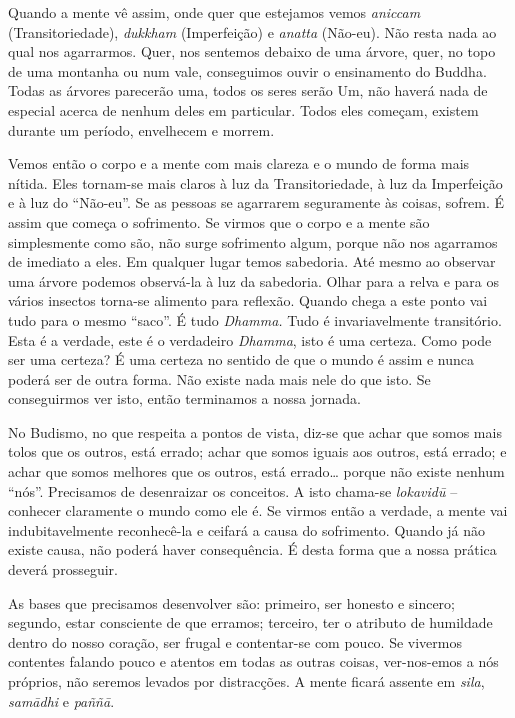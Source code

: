 Quando a mente vê assim, onde quer que estejamos vemos \emph{aniccam}
(Transitoriedade), \emph{dukkham} (Imperfeição) e \emph{anatta}
(Não-eu). Não resta nada ao qual nos agarrarmos. Quer, nos sentemos
debaixo de uma árvore, quer, no topo de uma montanha ou num vale,
conseguimos ouvir o ensinamento do Buddha. Todas as árvores parecerão
uma, todos os seres serão Um, não haverá nada de especial acerca de
nenhum deles em particular. Todos eles começam, existem durante um
período, envelhecem e morrem.

Vemos então o corpo e a mente com mais clareza e o mundo de forma mais
nítida. Eles tornam-se mais claros à luz da Transitoriedade, à luz da
Imperfeição e à luz do ``Não-eu''. Se as pessoas se agarrarem
seguramente às coisas, sofrem. É assim que começa o sofrimento. Se
virmos que o corpo e a mente são simplesmente como são, não surge
sofrimento algum, porque não nos agarramos de imediato a eles. Em
qualquer lugar temos sabedoria. Até mesmo ao observar uma árvore podemos
observá-la à luz da sabedoria. Olhar para a relva e para os vários
insectos torna-se alimento para reflexão. Quando chega a este ponto vai
tudo para o mesmo ``saco''. É tudo \emph{Dhamma.} Tudo é invariavelmente
transitório. Esta é a verdade, este é o verdadeiro \emph{Dhamma}, isto é
uma certeza. Como pode ser uma certeza? É uma certeza no sentido de que
o mundo é assim e nunca poderá ser de outra forma. Não existe nada mais
nele do que isto. Se conseguirmos ver isto, então terminamos a nossa
jornada.

No Budismo, no que respeita a pontos de vista, diz-se que achar que
somos mais tolos que os outros, está errado; achar que somos iguais aos
outros, está errado; e achar que somos melhores que os outros, está
errado\ldots{} porque não existe nenhum ``nós''. Precisamos de
desenraizar os conceitos. A isto chama-se \emph{lokavidū} -- conhecer
claramente o mundo como ele é. Se virmos então a verdade, a mente vai
indubitavelmente reconhecê-la e ceifará a causa do sofrimento. Quando já
não existe causa, não poderá haver consequência. É desta forma que a
nossa prática deverá prosseguir.

As bases que precisamos desenvolver são: primeiro, ser honesto e
sincero; segundo, estar consciente de que erramos; terceiro, ter o
atributo de humildade dentro do nosso coração, ser frugal e contentar-se
com pouco. Se vivermos contentes falando pouco e atentos em todas as
outras coisas, ver-nos-emos a nós próprios, não seremos levados por
distracções. A mente ficará assente em \emph{sila}, \emph{samādhi} e
\emph{paññā}.

